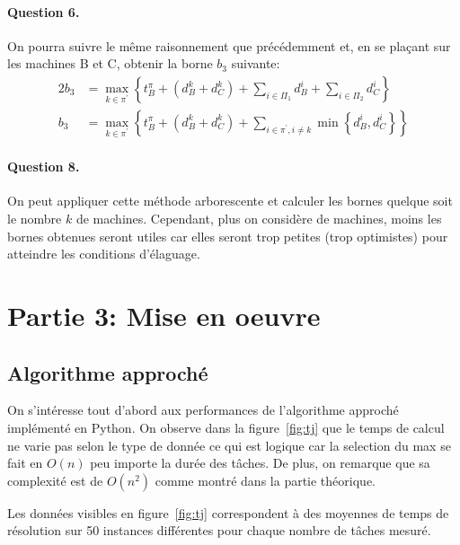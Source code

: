 \documentclass[a4paper, 10pt]{article}
\begin{document}
		\paragraph{Question 6.}{On pourra suivre le même raisonnement que précédemment et, en se plaçant sur les machines B et C, obtenir la borne $b_3$ suivante:
		\begin{alignat*}{2}
			b_3 &= \max_{k \in \pi^\prime} \left\{ t^{\pi}_B + \left( d^k_B + d^k_C \right) + \sum_{i \in \Pi_1} d^i_B + \sum_{i \in \Pi_2} d^i_C \right\} \\
			b_3 &= \max_{k \in \pi^\prime} \left\{ t^{\pi}_B + \left( d^k_B + d^k_C \right) + \sum_{i \in \pi^\prime, i \ne k} \min \left\{ d^i_B, d^i_C \right\} \right\}
		\end{alignat*}
		}
		
		\paragraph{Question 8.}{On peut appliquer cette méthode arborescente et calculer les bornes quelque soit le nombre $k$ de machines. Cependant, plus on considère de machines, moins les bornes obtenues seront utiles car elles seront trop petites (trop optimistes) pour atteindre les conditions d'élaguage. 		
		}
	
	\section*{Partie 3: Mise en oeuvre}
		\subsection*{Algorithme approché}
		
		On s'intéresse tout d'abord aux performances de l'algorithme approché implémenté en Python. On observe dans la figure~\ref{fig:tj} que le temps de calcul ne varie pas selon le type de donnée ce qui est logique car la selection du max se fait en $O(n)$ peu importe la durée des tâches. De plus, on remarque que sa complexité est de $O(n^2)$ comme montré dans la partie théorique.
		
		Les données visibles en figure~\ref{fig:tj} correspondent à des moyennes de temps de résolution sur 50 instances différentes pour chaque nombre de tâches mesuré.
		
\end{document}
